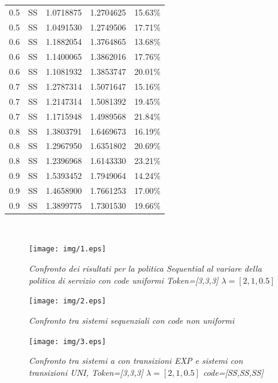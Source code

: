 \documentclass[12pt,a4paper,italian]{article}
\begin{document}
\begin{table}[ht!]
\begin{minipage}[b]{0.48\linewidth}
\begin{tabular}{c c c c c}
			0.5 & SS & 1.0718875 &   1.2704625    & 15.63\% \\
			0.5 & SS & 1.0491530 &   1.2749506    & 17.71\% \\\hline \hline
			0.6 & SS & 1.1882054 &   1.3764865    & 13.68\% \\
			0.6 & SS & 1.1400065 &   1.3862016    & 17.76\% \\
			0.6 & SS & 1.1081932 &   1.3853747    & 20.01\% \\\hline \hline
			0.7 & SS & 1.2787314 &   1.5071647    & 15.16\% \\
			0.7 & SS & 1.2147314 &   1.5081392    & 19.45\% \\
			0.7 & SS & 1.1715948 &   1.4989568    & 21.84\% \\ \hline \hline
			0.8 & SS & 1.3803791 &   1.6469673    & 16.19\% \\
			0.8 & SS & 1.2967950 &   1.6351802    & 20.69\% \\
			0.8 & SS & 1.2396968 &   1.6143330    & 23.21\% \\ \hline \hline
			0.9 & SS & 1.5393452 &   1.7949064    & 14.24\% \\
			0.9 & SS & 1.4658900 &   1.7661253    & 17.00\% \\
			0.9 & SS & 1.3899775 &   1.7301530    & 19.66\% \\\hline 
			
			
		\end{tabular}
		
	\end{minipage}
\end{table}
\ \\
\begin{figure}[ht!]
		\centering
		\texttt{[image: img/1.eps]}
		\caption{\emph{Confronto dei risultati per la politica Sequential al variare della politica di servizio con code uniformi Token=[3,3,3] $\lambda=[2,1,0.5]$}}
\end{figure}
\begin{figure}[ht!]
	\centering
	\texttt{[image: img/2.eps]}
	\caption{\emph{Confronto tra sistemi sequenziali con code non uniformi}}
\end{figure}
\begin{figure}[ht!]
	\centering
	\texttt{[image: img/3.eps]}
	\caption{\emph{Confronto tra sistemi a con transizioni EXP e sistemi con transizioni UNI, Token=[3,3,3] $\lambda=[2,1,0.5]$ code=[SS,SS,SS]}}\label{uni}
\end{figure}
\ \\
\newline
\end{document}

